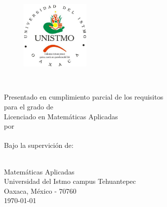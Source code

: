 \thispagestyle{empty}
\vspace*{0.50cm}
\begin{center}
	\begin{figure}[t]
		\centering
		\includegraphics[width=0.3\textwidth]{HeadTail/unistmo.jpeg}
	\end{figure}
 {\LARGE  {\thesistitle}\\}

\vspace*{1.20cm}
{ Presentado en cumplimiento parcial de los requisitos
\\
para el grado de
}\\

\vspace*{1.0cm}
{\Large {Licenciado en Matemáticas Aplicadas}}\\

\vspace*{0.5cm}
{por}\\

\vspace*{0.5cm}
{\Large{\authorname}}\\

\vspace*{1cm}
{ Bajo la supervición de:}\\

\vspace*{0.3cm}
{\large{ \supervisorname}}\\

\vspace*{0.50cm}


\vspace*{0.50cm}
{ Matemáticas Aplicadas\\
Universidad del Istmo campus Tehuantepec\\
Oaxaca, México - 70760\\
\today} \\%
\vspace{1.8cm}

\end{center}

\clearpage

\thispagestyle{plain}
\clearpage
